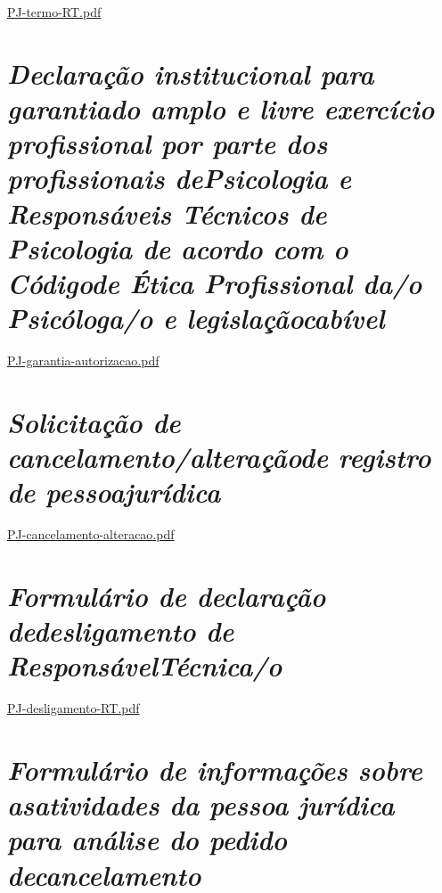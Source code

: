 \href{file:///C:/Users/angelo.cuissi/Documents/cuissi/caderno/revisão/202406/carta-de-servicos/carta-preparacao-de-original/PJ-termo-RT.pdf}{PJ-termo-RT.pdf}

\chapter{\texorpdfstring{\emph{Declaração institucional para garantiado amplo e livre exercício profissional por parte dos profissionais dePsicologia e Responsáveis Técnicos de Psicologia de acordo com o Códigode Ética Profissional da/o Psicóloga/o e legislaçãocabível}}{Declaração institucional para garantia do amplo e livre exercício profissional por parte dos profissionais de Psicologia e Responsáveis Técnicos de Psicologia de acordo com o Código de Ética Profissional da/o Psicóloga/o e legislação cabível}}

\href{file:///C:/Users/angelo.cuissi/Documents/cuissi/caderno/revisão/202406/carta-de-servicos/carta-preparacao-de-original/PJ-garantia-autorizacao.pdf}{PJ-garantia-autorizacao.pdf}

\chapter{\texorpdfstring{\emph{Solicitação de cancelamento/alteraçãode registro de pessoajurídica}}{Solicitação de cancelamento/alteração de registro de pessoa jurídica}}

\href{file:///C:/Users/angelo.cuissi/Documents/cuissi/caderno/revisão/202406/carta-de-servicos/carta-preparacao-de-original/PJ-cancelamento-alteracao.pdf}{PJ-cancelamento-alteracao.pdf}

\chapter{\texorpdfstring{\emph{Formulário de declaração dedesligamento de ResponsávelTécnica/o}}{Formulário de declaração de desligamento de Responsável Técnica/o}}

\href{file:///C:/Users/angelo.cuissi/Documents/cuissi/caderno/revisão/202406/carta-de-servicos/carta-preparacao-de-original/PJ-desligamento-RT.pdf}{PJ-desligamento-RT.pdf}

\chapter{\texorpdfstring{\emph{Formulário de informações sobre asatividades da pessoa jurídica para análise do pedido decancelamento}}{Formulário de informações sobre as atividades da pessoa jurídica para análise do pedido de cancelamento}}

